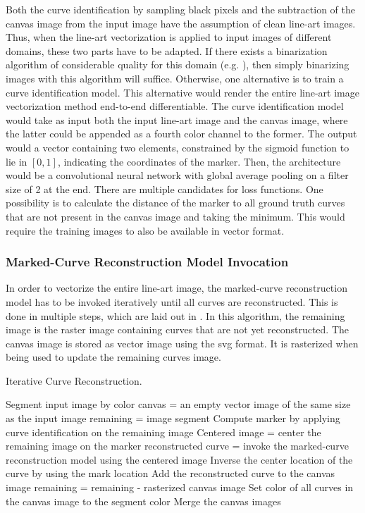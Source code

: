 Both the curve identification by sampling black pixels and the subtraction of the canvas image from the input image have the assumption of clean line-art images. Thus, when the line-art vectorization is applied to input images of different domains, these two parts have to be adapted. If there exists a binarization algorithm of considerable quality for this domain (e.g. \citet{DBLP:conf/das/SuLT10}), then simply binarizing images with this algorithm will suffice. Otherwise, one alternative is to train a curve identification model. This alternative would render the entire line-art image vectorization method end-to-end differentiable. The curve identification model would take as input both the input line-art image and the canvas image, where the latter could be appended as a fourth color channel to the former. The output would a vector containing two elements, constrained by the sigmoid function to lie in $[0,1]$, indicating the coordinates of the marker. Then, the architecture would be a convolutional neural network with global average pooling on a filter size of 2 at the end. There are multiple candidates for loss functions. One possibility is to calculate the distance of the marker to all ground truth curves that are not present in the canvas image and taking the minimum. This would require the training images to also be available in vector format.

\subsubsection{Marked-Curve Reconstruction Model Invocation}
\label{subsubsec:model.invok}

In order to vectorize the entire line-art image, the marked-curve reconstruction model has to be invoked iteratively until all curves are reconstructed. This is done in multiple steps, which are laid out in . In this algorithm, the remaining image is the raster image containing curves that are not yet reconstructed. The canvas image is stored as vector image using the \gls{svg} format. It is rasterized when being used to update the remaining curves image.


\begin{algorithm}
  \caption{Iterative Curve Reconstruction.}
  \label{alg:iterative.recon}
  Segment input image by color\;
  {
  canvas = an empty vector image of the same size as the input image\;
  remaining = image segment\;
  {
  Compute marker by applying curve identification on the remaining image\;
  Centered image = center the remaining image on the marker\;
  reconstructed curve = invoke the marked-curve reconstruction model using the centered image\;
  Inverse the center location of the curve by using the mark location\;
  Add the reconstructed curve to the canvas image\;
  remaining = remaining - rasterized canvas image\;
  }
  Set color of all curves in the canvas image to the segment color\;
  }
  Merge the canvas images\;
\end{algorithm}

